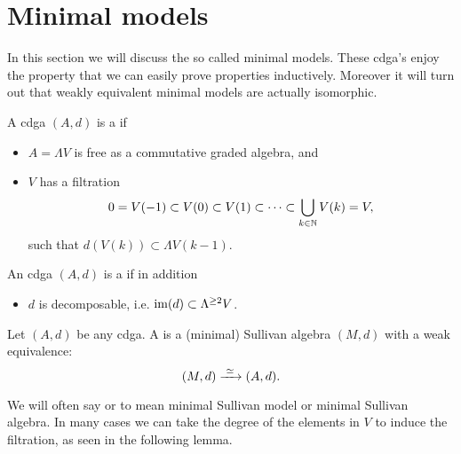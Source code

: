
\chapter{Minimal models}
\label{sec:minimal-models}

In this section we will discuss the so called minimal models. These cdga's enjoy the property that we can easily prove properties inductively. Moreover it will turn out that weakly equivalent minimal models are actually isomorphic.

\begin{definition}
	A cdga $(A, d)$ is a  if
	\begin{itemize}
		\item $A = \Lambda V$ is free as a commutative graded algebra, and
		\item $V$ has a filtration
		$$ 0 = V(-1) \subset V(0) \subset V(1) \subset \cdots \subset \bigcup_{k \in \mathbb{N}} V(k) = V, $$
		such that $d(V(k)) \subset \Lambda V(k-1)$.
	\end{itemize}

	An cdga $(A, d)$ is a  if in addition
	\begin{itemize}
		\item $d$ is decomposable, i.e. $\operatorname*{im}(d) \subset \Lambda^{\geq 2}V$.
	\end{itemize}
\end{definition}

\begin{definition}
	Let $(A, d)$ be any cdga. A  is a (minimal) Sullivan algebra $(M, d)$ with a weak equivalence:
	$$ (M, d) \xrightarrow{\,\,{\simeq}\,\,} (A, d). $$
\end{definition}

We will often say  or  to mean minimal Sullivan model or minimal Sullivan algebra. In many cases we can take the degree of the elements in $V$ to induce the filtration, as seen in the following lemma.


